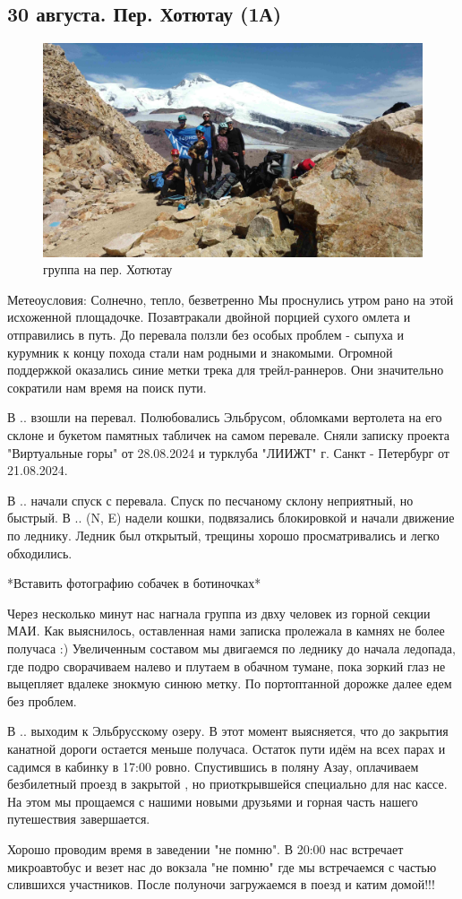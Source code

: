 \subsection{30 августа. Пер. Хотютау (1А)}

\begin{figure}[h!]
	\centering
	\includegraphics[width=0.7\linewidth]{../pics/DJI_0899}
	\caption{группа на пер. Хотютау}
	\label{fig:hotyutau_1}
\end{figure}
Метеоусловия: Солнечно, тепло, безветренно
Мы проснулись утром рано на этой исхоженной площадочке. Позавтракали двойной порцией сухого омлета и отправились в путь.
До перевала ползли без особых проблем - сыпуха и курумник к концу похода стали нам родными и знакомыми. Огромной поддержкой оказались синие метки трека для трейл-раннеров. Они значительно сократили нам время на поиск пути.

В .. взошли на перевал. Полюбовались Эльбрусом, обломками вертолета на его склоне и букетом памятных табличек на самом перевале. Сняли записку проекта "Виртуальные горы" от 28.08.2024 и турклуба "ЛИИЖТ" г. Санкт - Петербург от 21.08.2024.

В .. начали спуск с перевала. Спуск по песчаному склону неприятный, но быстрый. В .. (N, E) надели кошки, подвязались блокировкой и начали движение по леднику. Ледник был открытый, трещины хорошо просматривались и легко обходились.

*Вставить фотографию собачек в ботиночках*

Через несколько минут нас нагнала группа из двху человек из горной секции МАИ. Как выяснилось, оставленная нами записка пролежала в камнях не более получаса :) Увеличенным составом мы двигаемся по леднику до начала ледопада, где подро сворачиваем налево и плутаем в обачном тумане, пока зоркий глаз не выцепляет вдалеке знокмую синюю метку. По портоптанной дорожке далее едем без проблем. 

В .. выходим к Эльбрусскому озеру. В этот момент выясняется, что до закрытия канатной дороги остается меньше получаса. Остаток пути идём на всех парах и садимся в кабинку в 17:00 ровно. Спустившись в поляну Азау, оплачиваем безбилетный проезд в закрытой , но приоткрывшейся специально для нас кассе. На этом мы прощаемся с нашими новыми друзьями и горная часть нашего путешествия завершается.

Хорошо проводим время в заведении "не помню". В 20:00 нас встречает микроавтобус и везет нас до вокзала "не помню" где мы встречаемся с частью слившихся участников. После полуночи загружаемся в поезд и катим домой!!!







\newpage